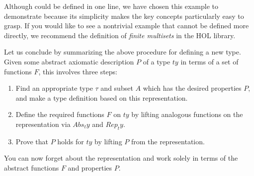 \begin{isabellebody}
\begin{isamarkuptext}
Although  could be defined in one line, we have chosen this
example to demonstrate  because its simplicity makes the
key concepts particularly easy to grasp. If you would like to see a
nontrivial example that cannot be defined more directly, we recommend the
definition of \emph{finite multisets} in the HOL library.

Let us conclude by summarizing the above procedure for defining a new type.
Given some abstract axiomatic description $P$ of a type $ty$ in terms of a
set of functions $F$, this involves three steps:
\begin{enumerate}
\item Find an appropriate type $\tau$ and subset $A$ which has the desired
  properties $P$, and make a type definition based on this representation.
\item Define the required functions $F$ on $ty$ by lifting
analogous functions on the representation via $Abs_ty$ and $Rep_ty$.
\item Prove that $P$ holds for $ty$ by lifting $P$ from the representation.
\end{enumerate}
You can now forget about the representation and work solely in terms of the
abstract functions $F$ and properties $P$.%
\end{isamarkuptext}%
\end{isabellebody}%
